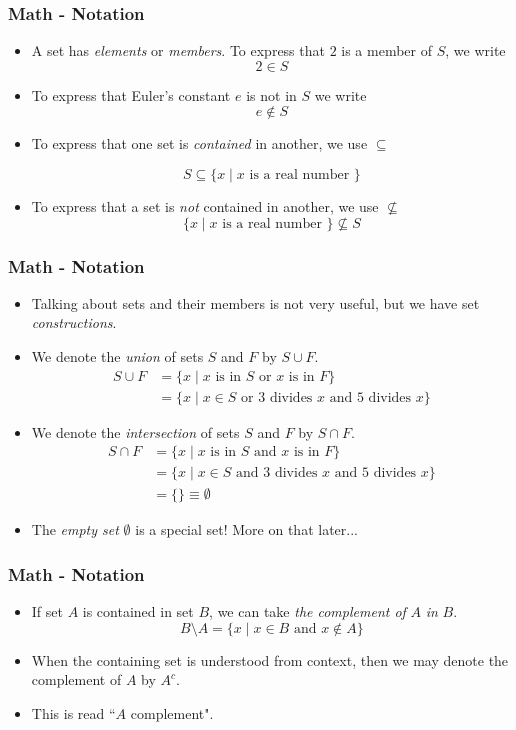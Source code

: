 \documentclass{beamer}
\begin{document}
\frame
{
\frametitle{Math - Notation}
\begin{itemize}[<+->]
\item A set has \emph{elements} or \emph{members}. To express that $2$ is a member of $S$, we write 
\[ 2 \in S \]
\item To express that Euler's constant $e$ is not in $S$ we write
\[ e \notin S\]
\item To express that one set is \emph{contained} in another, we use $\subseteq$

\[ S \subseteq \{x \mid x \text{ is a real number } \} \]
\item To express that a set is \emph{not} contained in another, we use $\not\subseteq$ 
\[ \{x \mid x \text{ is a real number } \} \not\subseteq S \]

\end{itemize}
}

\frame
{
\frametitle{Math - Notation}
\begin{itemize}[<+->]
\item Talking about sets and their members is not very useful, but we have set \emph{constructions}.
\item We denote the \emph{union} of sets $S$ and $F$ by $S \cup F$.
\begin{equation} 
\begin{split}
S \cup F & = \{ x \mid x \text{ is in } S \text{ or } x \text{ is in } F\} \\
 & = \{ x \mid x \in S \text{ or } 3 \text{ divides } x \text{ and } 5 \text{ divides } x \}
\end{split}
\end{equation}
\item We denote the \emph{intersection} of sets $S$ and $F$ by $S \cap F$.
\begin{equation} 
\begin{split}
S \cap F & = \{ x \mid x \text{ is in } S \text{ and } x \text{ is in } F\} \\
 & = \{ x \mid x \in S \text{ and } 3 \text{ divides } x \text{ and } 5 \text{ divides } x \} \\
 & = \{ \} \equiv \emptyset
\end{split}
\end{equation}
\item The \emph{empty set} $\emptyset$ is a special set! More on that later...
\end{itemize}
}

\frame
{
\frametitle{Math - Notation}
\begin{itemize}[<+->]
\item If set $A$ is contained in set $B$, we can take \emph{the complement of} $A$ \emph{in} $B$.
\[ B \setminus A = \{ x \mid x \in B \text{ and } x \notin A \}\]
\item When the containing set is understood from context, then we may denote the complement of $A$ by $A^c$.
\item This is read ``$A$ complement".
\end{itemize}
}
\end{document}
